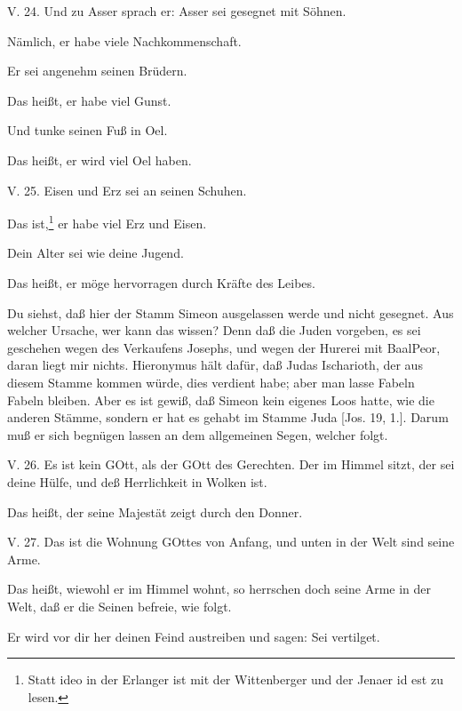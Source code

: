 \begin{schriftzitat}
V. 24. Und zu Asser sprach er: Asser sei gesegnet mit Söhnen.
\end{schriftzitat}

Nämlich, er habe viele Nachkommenschaft.

Er sei angenehm seinen Brüdern.

Das heißt, er habe viel Gunst.

Und tunke seinen Fuß in Oel.

Das heißt, er wird viel Oel haben.

\begin{schriftzitat}
V. 25. Eisen und Erz sei an seinen Schuhen.
\end{schriftzitat}

Das ist,\footnote{Statt ideo in der Erlanger ist mit der Wittenberger und der Jenaer id est zu lesen.} er habe viel Erz und Eisen.

Dein Alter sei wie deine Jugend.

Das heißt, er möge hervorragen durch Kräfte des Leibes.

Du siehst, daß hier der Stamm Simeon ausgelassen werde und nicht gesegnet. Aus welcher Ursache, wer kann das wissen? Denn daß die Juden vorgeben, es sei geschehen wegen des Verkaufens Josephs, und wegen der Hurerei mit BaalPeor, daran liegt mir nichts. Hieronymus hält dafür, daß Judas Ischarioth, der aus diesem Stamme kommen würde, dies verdient habe; aber man lasse Fabeln Fabeln bleiben. Aber es ist gewiß, daß Simeon kein eigenes Loos hatte, wie die anderen Stämme, sondern er hat es gehabt im Stamme Juda [Jos. 19, 1.]. Darum muß er sich begnügen lassen an dem allgemeinen Segen, welcher folgt.

\begin{schriftzitat}
V. 26. Es ist kein GOtt, als der GOtt des Gerechten. Der im Himmel sitzt, der sei deine Hülfe, und deß Herrlichkeit in Wolken ist.
\end{schriftzitat}

Das heißt, der seine Majestät zeigt durch den Donner.

\begin{schriftzitat}
V. 27. Das ist die Wohnung GOttes von Anfang, und unten in der Welt sind seine Arme.
\end{schriftzitat}

Das heißt, wiewohl er im Himmel wohnt, so herrschen doch seine Arme in der Welt, daß er die Seinen befreie, wie folgt.

Er wird vor dir her deinen Feind austreiben und sagen: Sei vertilget.

